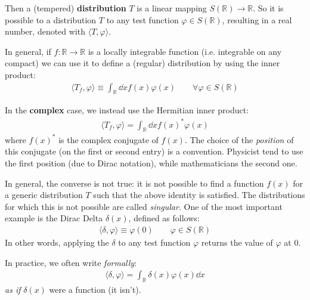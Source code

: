 \documentclass[../template.tex]{subfiles}
\begin{document}
Then a (tempered) \textbf{distribution} $T$ is a linear mapping $S(\mathbb{R}) \to \mathbb{R}$. So it is possible to  a distribution $T$ to any test function $\varphi \in S(\mathbb{R})$, resulting in a real number, denoted with $\langle T, \varphi \rangle$.

In general, if $f\colon \mathbb{R} \to \mathbb{R}$ is a locally integrable function (i.e. integrable on any compact) we can use it to define a (regular) distribution by using the inner product:
\begin{align*}
    \langle T_f, \varphi \rangle \equiv \int_{\mathbb{R}} \dd{x} f(x)\varphi(x) \qquad \forall \varphi \in S(\mathbb{R})
\end{align*}

\begin{expl}In the \textbf{complex} case, we instead use the Hermitian inner product:
    \begin{align*}
        \langle T_f, \varphi \rangle = \int_{\mathbb{R}} \dd{x} f(x)^* \varphi(x)
    \end{align*} 
    where $f(x)^*$ is the complex conjugate of $f(x)$. The choice of the \textit{position} of this conjugate (on the first or second entry) is a convention. Physicist tend to use the first position (due to Dirac notation), while mathematicians the second one.
\end{expl}

In general, the converse is not true: it is not possible to find a function $f(x)$ for a generic distribution $T$ such that the above identity is satisfied. The distributions for which this is not possible are called \textit{singular}. One of the most important example is the Dirac Delta $\delta(x)$, defined as follows:
\begin{align*}
    \langle \delta, \varphi \rangle \equiv \varphi(0) \qquad \varphi \in S(\mathbb{R})
\end{align*} 
In other words, applying the $\delta$ to any test function $\varphi$ returns the value of $\varphi$ at $0$.

In practice, we often write \textit{formally}:
\begin{align*}
    \langle \delta, \varphi \rangle = \int_{\mathbb{R}} \delta(x) \varphi(x) \dd{x}
\end{align*}
\textit{as if} $\delta(x)$ were a function (it isn't).   

\medskip
\end{document}
